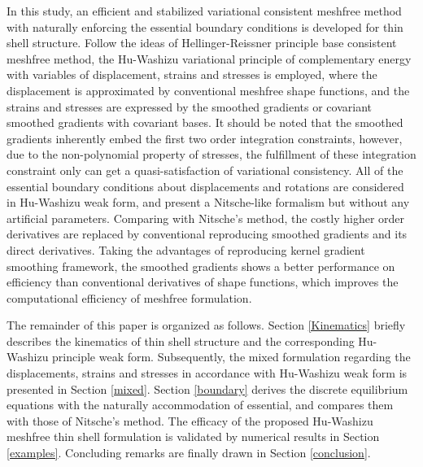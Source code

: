 In this study, an efficient and stabilized variational consistent meshfree method with naturally enforcing the essential boundary conditions is developed for thin shell structure. Follow the ideas of Hellinger-Reissner principle base consistent meshfree method, the Hu-Washizu variational principle of complementary energy \cite{dah-wei1985} with variables of displacement, strains and stresses is employed, where the displacement is approximated by conventional meshfree shape functions, and the strains and stresses are expressed by the smoothed gradients or covariant smoothed gradients with covariant bases. It should be noted that the smoothed gradients inherently embed the first two order integration constraints, however, due to the non-polynomial property of stresses, the fulfillment of these integration constraint only can get a quasi-satisfaction of variational consistency. All of the essential boundary conditions about displacements and rotations are considered in Hu-Washizu weak form, and present a Nitsche-like formalism but without any artificial parameters. Comparing with Nitsche's method, the costly higher order derivatives are replaced by conventional reproducing smoothed gradients and its direct derivatives. Taking the advantages of reproducing kernel gradient smoothing framework, the smoothed gradients shows a better performance on efficiency than conventional derivatives of shape functions, which improves the computational efficiency of meshfree formulation.

The remainder of this paper is organized as follows.
Section \ref{Kinematics} briefly describes the kinematics of thin shell structure and the corresponding Hu-Washizu principle weak form.
Subsequently, the mixed formulation regarding the displacements, strains and stresses in accordance with Hu-Washizu weak form is presented in Section \ref{mixed}.
Section \ref{boundary} derives the discrete equilibrium equations with the naturally accommodation of essential, and compares them with those of Nitsche's method.
The efficacy of the proposed Hu-Washizu meshfree thin shell formulation is validated by numerical results in Section \ref{examples}.
Concluding remarks are finally drawn in Section \ref{conclusion}.
